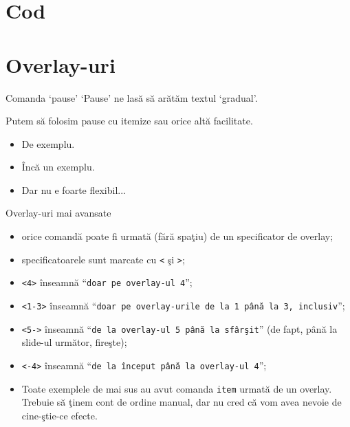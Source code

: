 \documentclass{beamer}
\begin{document}
\section{Cod}
\frame{\tableofcontents[currentsection]}



\section{Overlay-uri}
\frame{\tableofcontents[currentsection]}

\begin{frame}{Comanda `pause'}
`Pause' ne lasă să arătăm textul `gradual'.

\pause Putem să folosim pause cu itemize sau orice altă facilitate.
\begin{itemize}
\pause \item De exemplu.
\pause \item Încă un exemplu.
\pause \item Dar nu e foarte flexibil...
\end{itemize}
\end{frame}

\begin{frame}{Overlay-uri mai avansate}
\begin{itemize}
\item<3-> orice comandă poate fi urmată (fără spaţiu) de un specificator de
overlay;
\item<4-> specificatoarele sunt marcate cu \texttt{<} şi \texttt{>};
\item<5-> \texttt{<4>} înseamnă ``\texttt{doar pe overlay-ul 4}'';
\item<5-> \texttt{<1-3>} înseamnă ``\texttt{doar pe overlay-urile de la 1 până la 3,
inclusiv}'';
\item<6-> \texttt{<5->} înseamnă ``\texttt{de la overlay-ul 5 până la sfârşit}'' (de
fapt, până la slide-ul următor, fireşte);
\item<6-> \texttt{<-4>} înseamnă ``\texttt{de la început până la overlay-ul 4}'';
\item<7-> Toate exemplele de mai sus au avut comanda \texttt{item} urmată de
un overlay. Trebuie să ţinem cont de ordine manual, dar nu cred că vom avea
nevoie de cine-ştie-ce efecte.
\end{itemize}
\end{frame}
\end{document}
